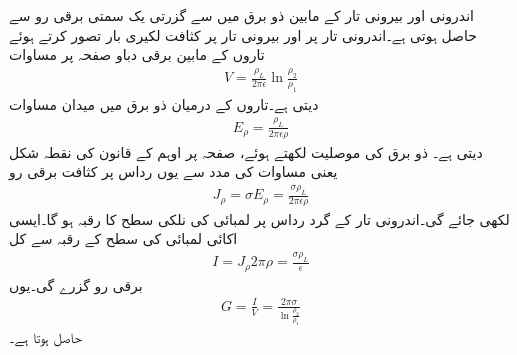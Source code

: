 اندرونی اور بیرونی تار کے مابین ذو برق میں سے گزرتی یک سمتی برقی رو  سے حاصل ہوتی ہے۔اندرونی تار پر  اور بیرونی تار پر  کثافت لکیری بار تصور کرتے ہوئے تاروں کے مابین برقی دباو صفحہ  پر مساوات 
\begin{align*}
V=\frac{\rho_L}{2\pi \epsilon} \ln \frac{\rho_2}{\rho_1}
\end{align*}
دیتی ہے۔تاروں کے درمیان ذو برق میں میدان مساوات 
\begin{align*}
E_{\rho}=\frac{\rho_L}{2\pi \epsilon \rho}
\end{align*}
دیتی ہے۔ ذو برق کی موصلیت  لکھتے ہوئے، صفحہ  پر اوہم کے قانون کی نقطہ شکل یعنی مساوات  کی مدد سے یوں رداس  پر کثافت  برقی رو
\begin{align*}
J_{\rho}=\sigma E_{\rho}=\frac{\sigma \rho_L}{2\pi \epsilon \rho}
\end{align*}
لکھی جائے گی۔اندرونی تار کے گرد رداس  پر  لمبائی کی نلکی سطح کا رقبہ  ہو گا۔ایسی اکائی لمبائی کی سطح کے رقبہ 
  سے کل
\begin{align*}
I= J_{\rho} 2\pi \rho=\frac{\sigma \rho_L}{\epsilon}
\end{align*}
برقی رو گزرے گی۔یوں
\begin{align}
G=\frac{I}{V}=\frac{2\pi \sigma}{\ln \frac{\rho_2}{\rho_1}}
\end{align}
حاصل ہوتا ہے۔

